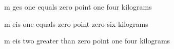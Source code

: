 m ges one equals zero point one four kilograms

m eis one equals zero point zero six kilograms

m eis two greater than zero point one four kilograms